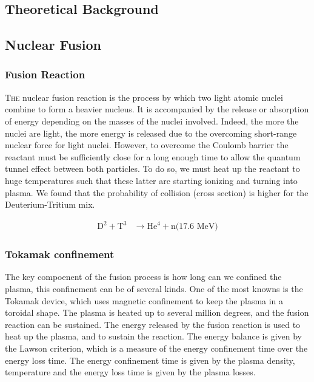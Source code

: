 \documentclass[11pt,a4paper]{report}
\begin{document}
\begin{multicols}{2}
    \chapter{Theoretical Background}

    \section{Nuclear Fusion}
    \subsection{Fusion Reaction}
    \lettrine[lines=2, lhang=.3, nindent=0pt]{\color{black} T}{he} nuclear fusion reaction is the process by which two light atomic nuclei combine to form a heavier nucleus. It is accompanied by the release or absorption of energy depending on the masses of the nuclei involved. Indeed, the more the nuclei are light, the  more  energy is released due to the overcoming short-range nuclear force for light nuclei.
    However, to overcome the Coulomb barrier the reactant must be sufficiently close for a long enough time to allow the quantum tunnel effect between both particles. To do so, we must heat up the reactant to huge temperatures such that these latter are starting ionizing and turning into plasma. We found that the probability of collision (cross section) is higher for the Deuterium-Tritium mix.

    \begin{align*}
        \text{D}^2 + \text{T}^3 & \rightarrow \text{He}^4 + \text{n(17.6 MeV)}
    \end{align*}
    \subsection{Tokamak confinement}
    The key compoenent of the fusion process is how long can we confined the plasma, this confinement can be of several kinds. One of the most knowns is the Tokamak device, which uses magnetic confinement to keep the plasma in a toroidal shape. The plasma is heated up to several million degrees, and the fusion reaction can be sustained. The energy released by the fusion reaction is used to heat up the plasma, and to sustain the reaction. The energy balance is given by the Lawson criterion, which is a measure of the energy confinement time over the energy loss time.
    The energy confinement time is given by the plasma density, temperature and the energy loss time is given by the plasma losses.


\end{multicols}
\end{document}
